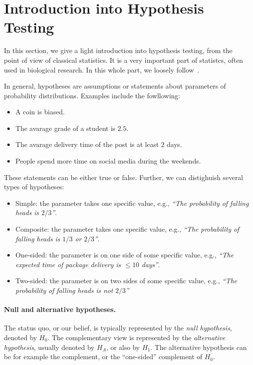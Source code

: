 



\section{Introduction into Hypothesis Testing}
\label{pvalue}
In this section, we give a light introduction into hypothesis testing, from the point of view of classical statistics.
It is a very important part of statistcs, often used in biological research.
In this whole part, we loosely follow~\cite{citacia}.

In general, hypotheses are assumptions or statements about parameters of probability distributions.
Examples include the fowllowing:
\begin{itemize}
\item
A coin is biased.
\item
The avarage grade of a student is $2.5$.
\item
The avarage delivery time of the post is at least $2$ days.
\item
People spend more time on social media during the weekends.
\end{itemize}
These statements can be either true or false.
Further, we can distighuish several types of hypotheses:
\begin{itemize}
\item
Simple: the parameter takes one specific value, e.g., \emph{``The probability of falling heads is $2/3$''}.
\item
Composite: the parameter takes one specific value, e.g., \emph{``The probability of falling heads is $1/3$ or $2/3$''}.
\item
One-sided: the parameter is on one side of some specific value, e.g., \emph{``The expected time of package delivery is $\leq 10$ days''}.
\item
Two-sided: the parameter is on two sides of some specific value, e.g., \emph{``The probability of falling heads is not $2/3$''}
\end{itemize}

\paragraph{Null and alternative hypotheses.}
The status quo, or our belief, is typically represented by the \emph{null hypothesis}, denoted by $H_0$.
The complementary view is represented by the \emph{alternative hypothesis}, usually denoted by $H_A$, or also by $H_1$.
The alternative hypothesis can be for example the complement, or the ``one-sided'' complement of $H_0$.


